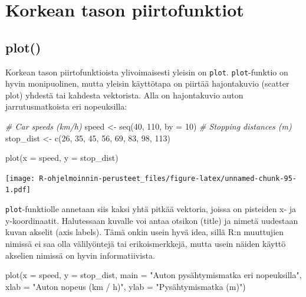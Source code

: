 \documentclass[
]{book}
\newenvironment{Shaded}{\begin{snugshade}}{\end{snugshade}}
\newcommand{\AttributeTok}[1]{\textcolor[rgb]{0.77,0.63,0.00}{#1}}
\newcommand{\CommentTok}[1]{\textcolor[rgb]{0.56,0.35,0.01}{\textit{#1}}}
\newcommand{\DecValTok}[1]{\textcolor[rgb]{0.00,0.00,0.81}{#1}}
\newcommand{\FunctionTok}[1]{\textcolor[rgb]{0.00,0.00,0.00}{#1}}
\newcommand{\NormalTok}[1]{#1}
\newcommand{\OtherTok}[1]{\textcolor[rgb]{0.56,0.35,0.01}{#1}}
\newcommand{\StringTok}[1]{\textcolor[rgb]{0.31,0.60,0.02}{#1}}
\begin{document}
\hypertarget{korkean-tason-piirtofunktiot}{%
\section{Korkean tason piirtofunktiot}\label{korkean-tason-piirtofunktiot}}

\hypertarget{plot}{%
\subsection{plot()}\label{plot}}

Korkean tason piirtofunktioista ylivoimaisesti yleisin on \texttt{plot}. \texttt{plot}-funktio on hyvin monipuolinen, mutta yleisin käyttötapa on piirtää hajontakuvio (scatter plot) yhdestä tai kahdesta vektorista. Alla on hajontakuvio auton jarrutusmatkoista eri nopeuksilla:

\begin{Shaded}
\begin{Highlighting}[]
\CommentTok{\# Car speeds (km/h)}
\NormalTok{speed }\OtherTok{\textless{}{-}} \FunctionTok{seq}\NormalTok{(}\DecValTok{40}\NormalTok{, }\DecValTok{110}\NormalTok{, }\AttributeTok{by =} \DecValTok{10}\NormalTok{)}
\CommentTok{\# Stopping distances (m)}
\NormalTok{stop\_dist }\OtherTok{\textless{}{-}} \FunctionTok{c}\NormalTok{(}\DecValTok{26}\NormalTok{, }\DecValTok{35}\NormalTok{, }\DecValTok{45}\NormalTok{, }\DecValTok{56}\NormalTok{, }\DecValTok{69}\NormalTok{, }\DecValTok{83}\NormalTok{, }\DecValTok{98}\NormalTok{, }\DecValTok{113}\NormalTok{)}

\FunctionTok{plot}\NormalTok{(}\AttributeTok{x =}\NormalTok{ speed, }\AttributeTok{y =}\NormalTok{ stop\_dist)}
\end{Highlighting}
\end{Shaded}

\texttt{[image: R-ohjelmoinnin-perusteet\_files/figure-latex/unnamed-chunk-95-1.pdf]}

\texttt{plot}-funktiolle annetaan siis kaksi yhtä pitkää vektoria, joissa on pisteiden x- ja y-koordinaatit. Halutessaan kuvalle voi antaa otsikon (title) ja nimetä uudestaan kuvan akselit (axis labels). Tämä onkin usein hyvä idea, sillä R:n muuttujien nimissä ei saa olla välilyöntejä tai erikoismerkkejä, mutta usein näiden käyttö akselien nimissä on hyvin informatiivista.

\begin{Shaded}
\begin{Highlighting}[]
\FunctionTok{plot}\NormalTok{(}\AttributeTok{x =}\NormalTok{ speed, }\AttributeTok{y =}\NormalTok{ stop\_dist,}
     \AttributeTok{main =} \StringTok{"Auton pysähtymismatka eri nopeuksilla"}\NormalTok{,}
     \AttributeTok{xlab =} \StringTok{"Auton nopeus (km / h)"}\NormalTok{, }\AttributeTok{ylab =} \StringTok{"Pysähtymismatka (m)"}\NormalTok{)}
\end{Highlighting}
\end{Shaded}
\end{document}
